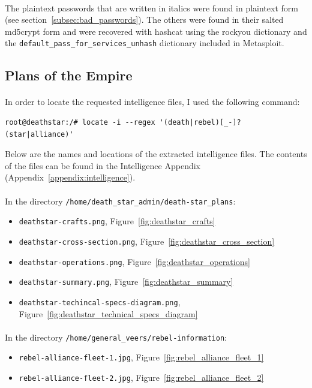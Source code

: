 \documentclass{article}
\begin{document}
\paragraph{}
The plaintext passwords that are written in italics were found in plaintext form (see section~\ref{subsec:bad_passwords}).
The others were found in their salted md5crypt form and were recovered with hashcat using the rockyou dictionary and the \texttt{default\_pass\_for\_services\_unhash} dictionary included in Metasploit.

\newpage

\subsection{Plans of the Empire}
\label{subsec:empire_plans}
\paragraph{}
In order to locate the requested intelligence files, I used the following command:
\begin{verbatim}
root@deathstar:/# locate -i --regex '(death|rebel)[_-]?(star|alliance)'
\end{verbatim}
Below are the names and locations of the extracted intelligence files. The contents of the files can be found in the Intelligence Appendix (Appendix~\ref{appendix:intelligence}).

\paragraph{}
In the directory \texttt{/home/death\_star\_admin/death-star\_plans}:
\begin{itemize}
	\item \texttt{deathstar-crafts.png}, Figure~\ref{fig:deathstar_crafts}
	\item \texttt{deathstar-cross-section.png}, Figure~\ref{fig:deathstar_cross_section}
	\item \texttt{deathstar-operations.png}, Figure~\ref{fig:deathstar_operations}
	\item \texttt{deathstar-summary.png}, Figure~\ref{fig:deathstar_summary}
	\item \texttt{deathstar-techincal-specs-diagram.png}, Figure~\ref{fig:deathstar_technical_specs_diagram}
\end{itemize}

\paragraph{}
In the directory \texttt{/home/general\_veers/rebel-information}:
\begin{itemize}
	\item \texttt{rebel-alliance-fleet-1.jpg}, Figure~\ref{fig:rebel_alliance_fleet_1}
	\item \texttt{rebel-alliance-fleet-2.jpg}, Figure~\ref{fig:rebel_alliance_fleet_2}
\end{itemize}
\end{document}
